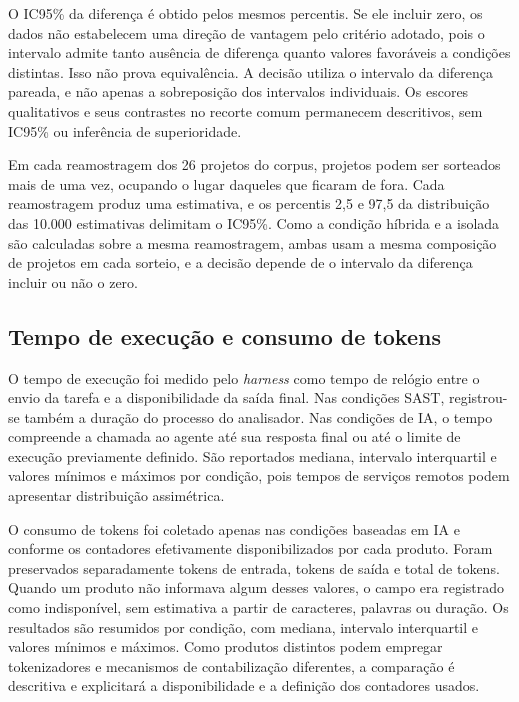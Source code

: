 O IC95\% da diferença é obtido pelos mesmos percentis. Se ele incluir zero, os dados não estabelecem uma direção de vantagem pelo critério adotado, pois o intervalo admite tanto ausência de diferença quanto valores favoráveis a condições distintas. Isso não prova equivalência. A decisão utiliza o intervalo da diferença pareada, e não apenas a sobreposição dos intervalos individuais. Os escores qualitativos e seus contrastes no recorte comum permanecem descritivos, sem IC95\% ou inferência de superioridade.

Em cada reamostragem dos 26 projetos do corpus, projetos podem ser sorteados mais de uma vez, ocupando o lugar daqueles que ficaram de fora. Cada reamostragem produz uma estimativa, e os percentis 2,5 e 97,5 da distribuição das 10.000 estimativas delimitam o IC95\%. Como a condição híbrida e a isolada são calculadas sobre a mesma reamostragem, ambas usam a mesma composição de projetos em cada sorteio, e a decisão depende de o intervalo da diferença incluir ou não o zero.

\subsection{Tempo de execução e consumo de tokens}\label{subsec:tempo-tokens-metodologia}

O tempo de execução foi medido pelo \textit{harness} como tempo de relógio entre o envio da tarefa e a disponibilidade da saída final. Nas condições SAST, registrou-se também a duração do processo do analisador. Nas condições de IA, o tempo compreende a chamada ao agente até sua resposta final ou até o limite de execução previamente definido. São reportados mediana, intervalo interquartil e valores mínimos e máximos por condição, pois tempos de serviços remotos podem apresentar distribuição assimétrica.

O consumo de tokens foi coletado apenas nas condições baseadas em IA e conforme os contadores efetivamente disponibilizados por cada produto. Foram preservados separadamente tokens de entrada, tokens de saída e total de tokens. Quando um produto não informava algum desses valores, o campo era registrado como indisponível, sem estimativa a partir de caracteres, palavras ou duração. Os resultados são resumidos por condição, com mediana, intervalo interquartil e valores mínimos e máximos. Como produtos distintos podem empregar tokenizadores e mecanismos de contabilização diferentes, a comparação é descritiva e explicitará a disponibilidade e a definição dos contadores usados.

